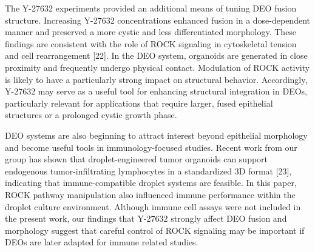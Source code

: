 \documentclass[
]{article}
\begin{document}
The Y-27632 experiments provided an additional means of tuning DEO fusion structure. Increasing Y-27632 concentrations enhanced fusion in a dose-dependent manner and preserved a more cystic and less differentiated morphology. These findings are consistent with the role of ROCK signaling in cytoskeletal tension and cell rearrangement {[}22{]}. In the DEO system, organoids are generated in close proximity and frequently undergo physical contact. Modulation of ROCK activity is likely to have a particularly strong impact on structural behavior. Accordingly, Y-27632 may serve as a useful tool for enhancing structural integration in DEOs, particularly relevant for applications that require larger, fused epithelial structures or a prolonged cystic growth phase.

DEO systems are also beginning to attract interest beyond epithelial morphology and become useful tools in immunology-focused studies. Recent work from our group has shown that droplet-engineered tumor organoids can support endogenous tumor-infiltrating lymphocytes in a standardized 3D format {[}23{]}, indicating that immune-compatible droplet systems are feasible. In this paper, ROCK pathway manipulation also influenced immune performance within the droplet culture environment. Although immune cell assays were not included in the present work, our findings that Y-27632 strongly affect DEO fusion and morphology suggest that careful control of ROCK signaling may be important if DEOs are later adapted for immune related studies.
\end{document}

